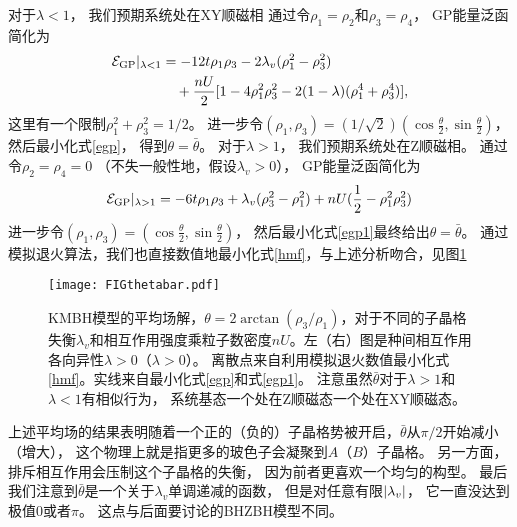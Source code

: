 对于$\lambda < 1$，
我们预期系统处在XY顺磁相
通过令$\rho_1=\rho_2$和$\rho_3=\rho_4$，
GP能量泛函简化为
\begin{equation}\label{egp}
\begin{split}
	\mathcal E_{\textnormal{GP}}\vert_{\lambda<1} &=-12t \rho_1\rho_3- 2 \lambda_v (\rho_1^2-\rho_3^2)\\
	&\quad +\frac{nU}{2}[1-4\rho_1^2 \rho_3^2-2(1-\lambda)(\rho_1^4+\rho_3^4)],
\end{split}
\end{equation}
这里有一个限制$\rho_1^2+\rho_3^2=1/2$。
进一步令$(\rho_1,\rho_3)=(1/\sqrt{2})(\cos \frac{\theta}{2},\sin\frac{\theta}{2})$，
然后最小化式\eqref{egp}，
得到$\theta=\bar \theta$。
对于$\lambda > 1$，
我们预期系统处在Z顺磁相。
通过令$\rho_2=\rho_4=0$
（不失一般性地，假设$\lambda_v>0$），
GP能量泛函简化为
\begin{equation}\label{egp1}
	\mathcal E_{\textnormal{GP}}\vert_{\lambda>1} = -6t \rho_1 \rho_3 + \lambda_v (\rho_3^2 - \rho_1^2) + nU(\frac{1}{2}-\rho_1^2 \rho_3^2)
\end{equation}
进一步令$(\rho_1,\rho_3)=(\cos \frac{\theta}{2},\sin\frac{\theta}{2})$，
然后最小化式\eqref{egp1}最终给出$\theta=\bar \theta $。
通过模拟退火算法，我们也直接数值地最小化式\eqref{hmf}，与上述分析吻合，见图\ref{KMBHtheta}%
\begin{figure}
	\texttt{[image: FIGthetabar.pdf]}
	\caption{\label{KMBHtheta}KMBH模型的平均场解，$\theta=2\arctan(\rho_3/\rho_1)$，对于不同的子晶格失衡$\lambda_v$和相互作用强度乘粒子数密度$nU$。左（右）图是种间相互作用各向异性$\lambda>0$（$\lambda>0$）。
	离散点来自利用模拟退火数值最小化式\eqref{hmf}。实线来自最小化式\eqref{egp}和式\eqref{egp1}。
	注意虽然$\bar\theta$对于$\lambda>1$和$\lambda<1$有相似行为，
	系统基态一个处在Z顺磁态一个处在XY顺磁态。}
\end{figure}
上述平均场的结果表明随着一个正的（负的）子晶格势被开启，$\bar \theta$从$\pi/2$开始减小（增大），
这个物理上就是指更多的玻色子会凝聚到$A$（$B$）子晶格。
另一方面，排斥相互作用会压制这个子晶格的失衡，
因为前者更喜欢一个均匀的构型。
最后我们注意到$\bar \theta$是一个关于$\lambda_v$单调递减的函数，
但是对任意有限$\abs{\lambda_v}$，
它一直没达到极值$0$或者$\pi$。
这点与后面要讨论的BHZBH模型不同。

